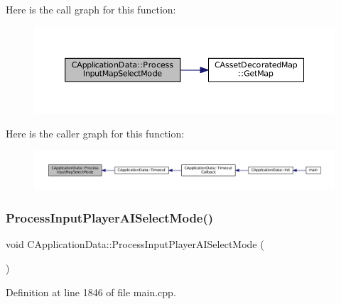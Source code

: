 Here is the call graph for this function\+:\nopagebreak
\begin{figure}[H]
\begin{center}
\leavevmode
\includegraphics[width=350pt]{classCApplicationData_a4fb3ad6900161476b5dace2d7cf9908c_cgraph}
\end{center}
\end{figure}
Here is the caller graph for this function\+:\nopagebreak
\begin{figure}[H]
\begin{center}
\leavevmode
\includegraphics[width=350pt]{classCApplicationData_a4fb3ad6900161476b5dace2d7cf9908c_icgraph}
\end{center}
\end{figure}
\hypertarget{classCApplicationData_a096afda0b6459cfa73d66518ce23f68e}{}\label{classCApplicationData_a096afda0b6459cfa73d66518ce23f68e} 
\subsubsection{\texorpdfstring{Process\+Input\+Player\+A\+I\+Select\+Mode()}{ProcessInputPlayerAISelectMode()}}
{\footnotesize\ttfamily void C\+Application\+Data\+::\+Process\+Input\+Player\+A\+I\+Select\+Mode (\begin{DoxyParamCaption}{ }\end{DoxyParamCaption})\hspace{0.3cm}{\ttfamily [protected]}}



Definition at line 1846 of file main.\+cpp.


